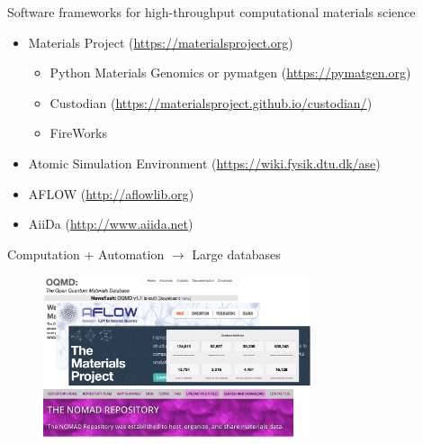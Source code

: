 \documentclass[aspectratio=169]{beamer}
\begin{document}
\begin{frame}{Software frameworks for high-throughput computational materials science}
\begin{itemize}
    \item Materials Project (\url{https://materialsproject.org})\cite{jainCommentaryMaterialsProject2013}
    \begin{itemize}
        \item Python Materials Genomics or pymatgen (\url{https://pymatgen.org})\cite{ongPythonMaterialsGenomics2013}
        \item Custodian (\url{https://materialsproject.github.io/custodian/})
        \item FireWorks \cite{jainFireWorksDynamicWorkflow2015}
    \end{itemize}
    \item Atomic Simulation Environment (\url{https://wiki.fysik.dtu.dk/ase})
    \item AFLOW (\url{http://aflowlib.org})\cite{curtaroloAFLOWLIBORGDistributed2012}
    \item AiiDa (\url{http://www.aiida.net})
\end{itemize}
\end{frame}


\begin{frame}{Computation + Automation $\rightarrow$ Large databases}
\begin{figure}
    \centering
    \includegraphics[width=0.7\textwidth]{lectures/slides_tex/figures/materials_databases.png}
\end{figure}
\end{frame}
\end{document}
